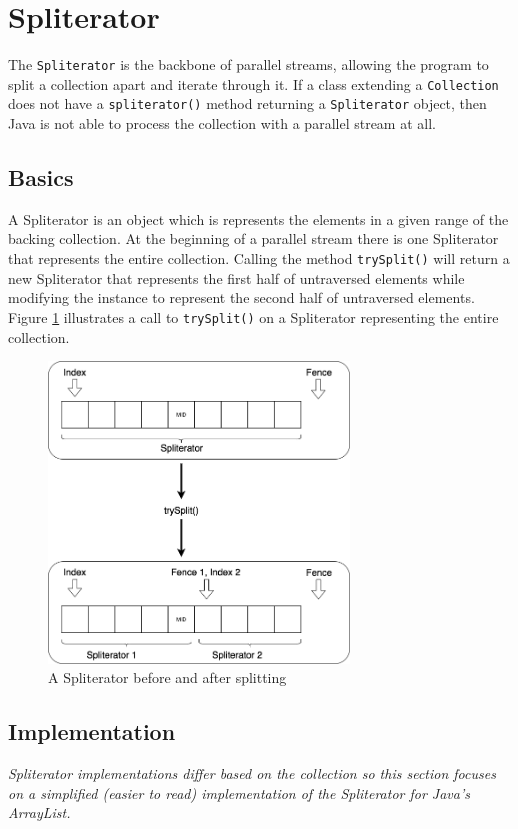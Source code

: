 \documentclass[oneside, a4paper, 11pt]{article}
\begin{document}


\section{Spliterator}
The \verb|Spliterator| is the backbone of parallel streams, allowing the program to split a collection apart and iterate through it. If a class extending a \verb|Collection| does not have a \verb|spliterator()| method returning a \verb|Spliterator| object, then Java is not able to process the collection with a parallel stream at all.

\subsection{Basics}
A Spliterator is an object which is represents the elements in a given range of the backing collection. At the beginning of a parallel stream there is one Spliterator that represents the entire collection. Calling the method \verb|trySplit()| will return a new Spliterator that represents the first half of untraversed elements while modifying the instance to represent the second half of untraversed elements. Figure \ref{fig:split} illustrates a call to \verb|trySplit()| on a Spliterator representing the entire collection.

\begin{figure}[H]
\centering
\includegraphics[width=8cm]{images/spliterator_illustrated.png}
\caption{A Spliterator before and after splitting}
\label{fig:split}
\end{figure}

\subsection{Implementation}
\textit{Spliterator implementations differ based on the collection so this section focuses on a simplified (easier to read) implementation of the Spliterator for Java's ArrayList.}
\end{document}
